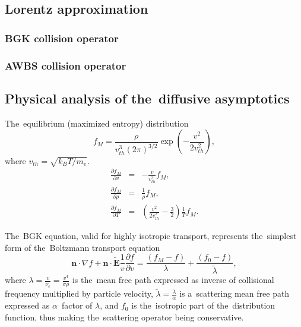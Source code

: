 \documentclass[review]{elsarticle}
\newcommand{\pdv}[2]{\frac{\partial{#1}}{\partial{#2}}}
\newcommand{\vect}[1]{\boldsymbol{#1}}
\newcommand{\mfp}{\lambda}
\newcommand{\tmfp}{\tilde{\lambda}}
\newcommand{\nue}{\nu_{e}}
\newcommand{\vmag}{v}
\newcommand{\vth}{v_{th}}
\newcommand{\vn}{\vect{n}}
\newcommand{\tE}{\vect{\tilde{E}}}
\newcommand{\me}{m_e}
\newcommand{\kB}{k_B}
\newcommand{\crs}{\sigma}
\newcommand{\fM}{f_M}
\begin{document}
\subsection{Lorentz approximation}
\subsubsection{BGK collision operator}
\subsubsection{AWBS collision operator}

\subsection{Physical analysis of the~diffusive asymptotics}\label{sec:diffusive_asymptotics}
The~equilibrium (maximized entropy) distribution
\begin{equation}
  \fM = \frac{\rho}{\vth^3 \left( 2 \pi \right)^{3/2}} 
  \exp\left(- \frac{\vmag^2}{2 \vth^2} \right) ,
  \label{eq:MaxBol}
\end{equation}
where $\vth = \sqrt{\kB T/\me}$.
\begin{eqnarray}
  \pdv{\fM}{\vmag} &=& -\frac{\vmag}{\vth^2}\fM ,
  \nonumber \\
  \pdv{\fM}{\rho} &=& \frac{1}{\rho}\fM ,
  \nonumber \\
  \pdv{\fM}{T} &=& \left( \frac{\vmag^2}{2 \vth^2} - \frac{3}{2}\right)
  \frac{1}{T}\fM. 
\end{eqnarray}

The~BGK equation, valid for highly isotropic transport, represents 
the~simplest form of the~Boltzmann transport equation
\begin{equation}
  \vn\cdot\nabla f + \vn\cdot\tE\frac{1}{\vmag}\pdv{f}{\vmag} = 
  \frac{\left(\fM - f\right)}{\mfp} + \frac{\left(f_0 - f\right)}{\tmfp} ,
  \label{eq:BGK}
\end{equation}
where $\mfp = \frac{\vmag}{\nue} = \frac{\vmag^4}{\crs\rho}$ is the~mean 
free path expressed as inverse of collisional frequency multiplied by 
particle velocity, $\tmfp = \frac{\mfp}{\alpha}$ is a~scattering mean free path 
expressed as $\alpha$~factor of $\mfp$, and $f_0$ is the~isotropic part
of the~distribution function, thus making the~scattering operator being 
conservative.
\end{document}
